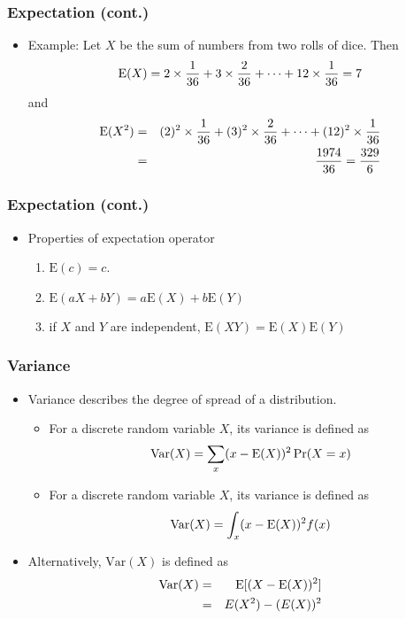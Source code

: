 \documentclass[pdflatex, 12pt]{beamer}
\begin{document}
\begin{frame}
\frametitle{Expectation (cont.)}
\begin{itemize}
\item Example: Let $X$ be the sum of numbers from two rolls of dice. Then
 \begin{equation}
 \mathrm{E}(X) = 2 \times \frac{1}{36} + 3 \times \frac{2}{36} + \cdots + 12 \times \frac{1}{36} = 7 \notag
 \end{equation}
 and 
 \begin{eqnarray}
 \mathrm{E}(X^2) &=& (2)^2 \times \frac{1}{36} + (3)^2 \times \frac{2}{36} + \cdots + (12)^2 \times \frac{1}{36} \notag \\
 &=& \frac{1974}{36} = \frac{329}{6} \notag
 \end{eqnarray}
\end{itemize}
\end{frame}

\begin{frame}
\frametitle{Expectation (cont.)}
\begin{itemize}
\item Properties of expectation operator
 \begin{enumerate}
 \item $\mathrm{E}(c) = c$.
 \item $\mathrm{E}(aX + bY) = a\mathrm{E}(X) + b\mathrm{E}(Y)$
 \item if $X$ and $Y$ are independent, $\mathrm{E}(XY) = \mathrm{E}(X)\mathrm{E}(Y)$
 \end{enumerate}
\end{itemize}
\end{frame}

\begin{frame}
\frametitle{Variance}
\begin{itemize}
\item Variance describes the degree of spread of a distribution.
 \begin{itemize}
 \item For a discrete random variable $X$, its variance is defined as
  \begin{equation}
  \mathrm{Var}(X) = \sum_{x} (x - \mathrm{E}(X))^2 \Pr(X = x) \notag
  \end{equation}
 \item For a discrete random variable $X$, its variance is defined as
  \begin{equation}
  \mathrm{Var}(X) = \int_{x} (x - \mathrm{E}(X))^2 f(x) \notag
  \end{equation}
 \end{itemize}
\vspace{0.2cm}
\item Alternatively, $\mathrm{Var}(X)$ is defined as 
 \begin{eqnarray}
 \mathrm{Var}(X) &=& \mathrm{E}[(X - \mathrm{E}(X))^2] \notag \\
 &=& E(X^2) - (E(X))^2
 \end{eqnarray}
\end{itemize}
\end{frame}
\end{document}
